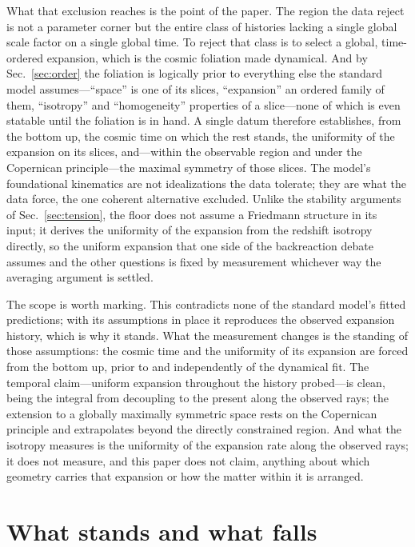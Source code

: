 \documentclass[aps,prd,reprint,amsmath,amssymb,superscriptaddress]{revtex4-2}
\begin{document}
What that exclusion reaches is the point of the paper. The region the data reject is not a parameter corner but the entire class of histories lacking a single global scale factor on a single global time. To reject that class is to select a global, time-ordered expansion, which is the cosmic foliation made dynamical. And by Sec.~\ref{sec:order} the foliation is logically prior to everything else the standard model assumes---``space'' is one of its slices, ``expansion'' an ordered family of them, ``isotropy'' and ``homogeneity'' properties of a slice---none of which is even statable until the foliation is in hand. A single datum therefore establishes, from the bottom up, the cosmic time on which the rest stands, the uniformity of the expansion on its slices, and---within the observable region and under the Copernican principle---the maximal symmetry of those slices. The model's foundational kinematics are not idealizations the data tolerate; they are what the data force, the one coherent alternative excluded. Unlike the stability arguments of Sec.~\ref{sec:tension}, the floor does not assume a Friedmann structure in its input; it derives the uniformity of the expansion from the redshift isotropy directly, so the uniform expansion that one side of the backreaction debate assumes and the other questions is fixed by measurement whichever way the averaging argument is settled.

The scope is worth marking. This contradicts none of the standard model's fitted predictions; with its assumptions in place it reproduces the observed expansion history, which is why it stands. What the measurement changes is the standing of those assumptions: the cosmic time and the uniformity of its expansion are forced from the bottom up, prior to and independently of the dynamical fit. The temporal claim---uniform expansion throughout the history probed---is clean, being the integral from decoupling to the present along the observed rays; the extension to a globally maximally symmetric space rests on the Copernican principle and extrapolates beyond the directly constrained region. And what the isotropy measures is the uniformity of the expansion rate along the observed rays; it does not measure, and this paper does not claim, anything about which geometry carries that expansion or how the matter within it is arranged.

\section{What stands and what falls}\label{sec:stands}
\end{document}
